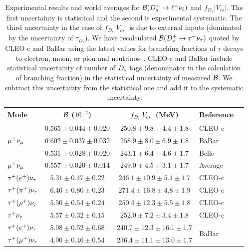 \begin{table}[t!]
\caption{Experimental results and world averages for ${\cal{B}}(D_{s}^+\to\ell^+\nu_{\ell})$ and $f_{D_s}|V_{cs}|$.
The first uncertainty is statistical and the second is experimental systematic. The third uncertainty 
in the case of $f_{D_s}|V_{cs}|$ is due to external inputs (dominated by the uncertainty of $\tau_{D_s}$).
We have recalculated ${\cal B}(D_{s}^+\to\tau^+\nu_{\tau})$ quoted by CLEO-c and BaBar using the latest 
values for branching fractions of $\tau$ decays to electron, muon, or pion and neutrinos~\cite{PDG_2012}.
CLEO-c and BaBar include statistical uncertainty of number of $D_{s}$ tags (denominator in the calculation of 
branching fraction) in the statistical uncertainty of measured ${\cal B}$. We subtract this uncertainty from the
statistical one and add it to the systematic uncertainty. 
\label{tab:DsLeptonic}}
\begin{center}
\begin{tabular}{lccll}
\toprule
\rowcolor{gray}
Mode 		& ${\cal{B}}$ ($10^{-2}$) 	& $f_{D_s}|V_{cs}|$ (MeV) 		& Reference & 
\\ \midrule
\multirow{3}{*}{$\mu^+\nu_{\mu}$}	& $0.565\pm0.044\pm 0.020$ 	& $250.8 \pm 9.8 \pm 4.4 \pm 1.8$	& CLEO-c &\cite{Alexander:2009ux}\\		
				& $0.602\pm0.037\pm 0.032$ 	& $258.9 \pm 8.0 \pm 6.9 \pm 1.8$	& BaBar  &\cite{delAmoSanchez:2010jg}\\
				& $0.531\pm0.028\pm 0.020$ 	& $243.1 \pm 6.4 \pm 4.6 \pm 1.7$ 	& Belle  &\cite{Zupanc:2013byn}\\
\midrule
\rowcolor{gray}
$\mu^+\nu_{\mu}$ 			& $0.557\pm0.020\pm0.014$ 		& $249.0 \pm 4.5 \pm 3.1 \pm 1.7$ 	& Average & \\
\midrule
$\tau^+(e^+)\nu_{\tau}$ 			& $5.31\pm0.47\pm0.22$ 		& $246.1 \pm 10.9 \pm 5.1 \pm 1.7$ 	& CLEO-c &\cite{Onyisi:2009th}\\
$\tau^+(\pi^+)\nu_{\tau}$ 			& $6.46\pm0.80\pm0.23$ 		& $271.4 \pm 16.8 \pm 4.8 \pm 1.9$  & CLEO-c &\cite{Alexander:2009ux}\\
$\tau^+(\rho^+)\nu_{\tau}$ 			& $5.50\pm0.54\pm0.24$ 		& $250.4 \pm 12.3 \pm 5.5 \pm 1.8$  & CLEO-c &\cite{Naik:2009tk}\\
\midrule
\rowcolor{lightgray}
$\tau^+\nu_{\tau}$			& $5.57\pm0.32\pm0.15$		& $252.0 \pm 7.2 \pm 3.4 \pm 1.8$   & CLEO-c & \\
\midrule
$\tau^+(e^+)\nu_{\tau}$ 			& $5.08\pm0.52\pm0.68$ 		& $240.7 \pm 12.3 \pm 16.1 \pm 1.7$	& \multirow{2}{*}{BaBar} & \multirow{2}{*}{\cite{delAmoSanchez:2010jg}}\\
$\tau^+(\mu^+)\nu_{\tau}$ 			& $4.90\pm0.46\pm0.54$ 		& $236.4 \pm 11.1 \pm 13.0 \pm 1.7$	&  & \\

\end{tabular}
\end{center}
\end{table}
